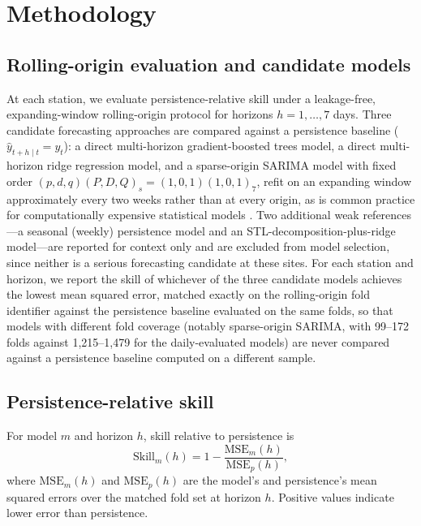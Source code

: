 \documentclass{article}
\begin{document}
\section{Methodology}

\subsection{Rolling-origin evaluation and candidate models}

At each station, we evaluate persistence-relative skill under a leakage-free,
expanding-window rolling-origin protocol for horizons $h=1,\dots,7$ days.
Three candidate forecasting approaches are compared against a persistence
baseline ($\hat{y}_{t+h\mid t}=y_t$): a direct multi-horizon gradient-boosted
trees model, a direct multi-horizon ridge regression model, and a sparse-origin
SARIMA model with fixed order $(p,d,q)(P,D,Q)_s=(1,0,1)(1,0,1)_7$, refit on an
expanding window approximately every two weeks rather than at every origin, as
is common practice for computationally expensive statistical models
\citep{boxjenkins2015}.
Two additional weak references---a seasonal (weekly) persistence model and an
STL-decomposition-plus-ridge model---are reported for context only and are
excluded from model selection, since neither is a serious forecasting
candidate at these sites.
For each station and horizon, we report the skill of whichever of the three
candidate models achieves the lowest mean squared error, matched exactly on
the rolling-origin fold identifier against the persistence baseline evaluated
on the same folds, so that models with different fold coverage (notably
sparse-origin SARIMA, with 99--172 folds against 1{,}215--1{,}479 for the
daily-evaluated models) are never compared against a persistence baseline
computed on a different sample.

\subsection{Persistence-relative skill}

For model $m$ and horizon $h$, skill relative to persistence is
\begin{equation}
  \mathrm{Skill}_m(h) = 1 - \frac{\mathrm{MSE}_m(h)}{\mathrm{MSE}_{p}(h)},
\end{equation}
where $\mathrm{MSE}_m(h)$ and $\mathrm{MSE}_p(h)$ are the model's and
persistence's mean squared errors over the matched fold set at horizon $h$.
Positive values indicate lower error than persistence.
\end{document}
